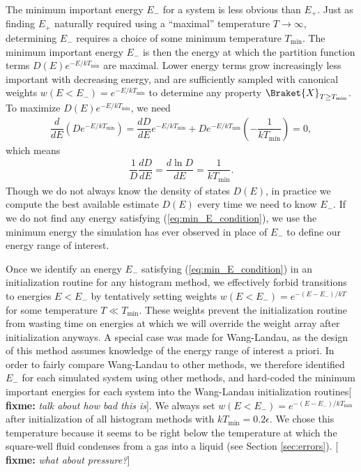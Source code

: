 \documentclass[11pt]{article}
\newcommand{\bk}{\Braket} %
\renewcommand{\t}{\text} %
\newcommand{\f}[2]{\dfrac{#1}{#2}} %
\newcommand{\p}[1]{\left(#1\right)} %
\newcommand{\red}[1]{{\bf \color{red} #1}}
\newcommand{\fixme}[1]{[\red{fixme:} \emph{#1}]}
\begin{document}
The minimum important energy $E_-$ for a system is less obvious than
$E_+$. Just as finding $E_+$ naturally required using a ``maximal''
temperature $T\to\infty$, determining $E_-$ requires a choice of some
minimum temperature $T_{\t{min}}$. The minimum important energy $E_-$
is then the energy at which the partition function terms
$D\p{E}e^{-E/kT_{\t{min}}}$ are maximal. Lower energy terms grow
increasingly less important with decreasing energy, and are
sufficiently sampled with canonical weights
$w\p{E<E_-}=e^{-E/kT_{\t{min}}}$ to determine any property
$\bk{X}_{T\ge T_{\t{min}}}$. To maximize $D\p{E}e^{-E/kT_{\t{min}}}$,
we need
\begin{align}
  \f{d}{dE}\p{De^{-E/kT_{\t{min}}}}
  =\f{dD}{dE}e^{-E/kT_{\t{min}}}+De^{-E/kT_{\t{min}}}\p{-\f{1}{kT_{\t{min}}}}=0,
  \label{eq:min_E_setup}
\end{align}
which means
\begin{align}
  \f1{D}\f{dD}{dE}=\f{d\ln D}{dE}=\f{1}{kT_{\t{min}}}.
  \label{eq:min_E_condition}
\end{align}
Though we do not always know the density of states $D\p{E}$, in
practice we compute the best available estimate $D\p{E}$ every time we
need to know $E_-$. If we do not find any energy satisfying
(\ref{eq:min_E_condition}), we use the minimum energy the simulation
has ever observed in place of $E_-$ to define our energy range of
interest.

Once we identify an energy $E_-$ satisfying (\ref{eq:min_E_condition})
in an initialization routine for any histogram method, we effectively
forbid transitions to energies $E<E_-$ by tentatively setting weights
$w\p{E<E_-}=e^{-\p{E-E_-}/kT}$ for some temperature $T\ll
T_{\t{min}}$. These weights prevent the initialization routine from
wasting time on energies at which we will override the weight array
after initialization anyways. A special case was made for Wang-Landau,
as the design of this method assumes knowledge of the energy range of
interest a priori. In order to fairly compare Wang-Landau to other
methods, we therefore identified $E_-$ for each simulated system using
other methods, and hard-coded the minimum important energies for each
system into the Wang-Landau initialization routines\fixme{talk about
  how bad this is}. We always set
$w\p{E<E_-}=e^{-\p{E-E_-}/kT_{\t{min}}}$ after initialization of all
histogram methods with $kT_{\t{min}}=0.2\epsilon$. We chose this
temperature because it seems to be right below the temperature at
which the square-well fluid condenses from a gas into a
liquid (see Section \ref{sec:errors}). \fixme{what about pressure?}
\end{document}

